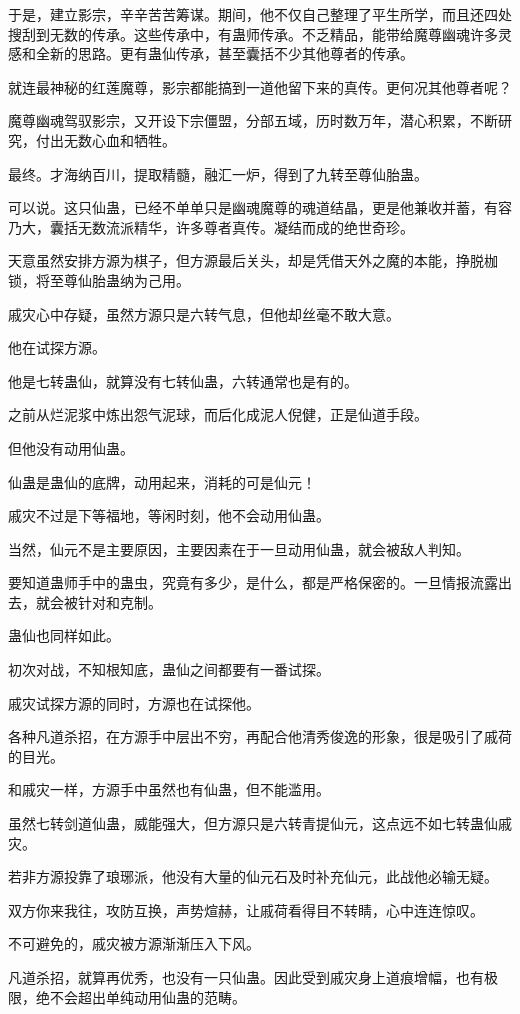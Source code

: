 \begin{this_body}
于是，建立影宗，辛辛苦苦筹谋。期间，他不仅自己整理了平生所学，而且还四处搜刮到无数的传承。这些传承中，有蛊师传承。不乏精品，能带给魔尊幽魂许多灵感和全新的思路。更有蛊仙传承，甚至囊括不少其他尊者的传承。

就连最神秘的红莲魔尊，影宗都能搞到一道他留下来的真传。更何况其他尊者呢？

魔尊幽魂驾驭影宗，又开设下宗僵盟，分部五域，历时数万年，潜心积累，不断研究，付出无数心血和牺牲。

最终。才海纳百川，提取精髓，融汇一炉，得到了九转至尊仙胎蛊。

可以说。这只仙蛊，已经不单单只是幽魂魔尊的魂道结晶，更是他兼收并蓄，有容乃大，囊括无数流派精华，许多尊者真传。凝结而成的绝世奇珍。

天意虽然安排方源为棋子，但方源最后关头，却是凭借天外之魔的本能，挣脱枷锁，将至尊仙胎蛊纳为己用。

戚灾心中存疑，虽然方源只是六转气息，但他却丝毫不敢大意。

他在试探方源。

他是七转蛊仙，就算没有七转仙蛊，六转通常也是有的。

之前从烂泥浆中炼出怨气泥球，而后化成泥人倪健，正是仙道手段。

但他没有动用仙蛊。

仙蛊是蛊仙的底牌，动用起来，消耗的可是仙元！

戚灾不过是下等福地，等闲时刻，他不会动用仙蛊。

当然，仙元不是主要原因，主要因素在于一旦动用仙蛊，就会被敌人判知。

要知道蛊师手中的蛊虫，究竟有多少，是什么，都是严格保密的。一旦情报流露出去，就会被针对和克制。

蛊仙也同样如此。

初次对战，不知根知底，蛊仙之间都要有一番试探。

戚灾试探方源的同时，方源也在试探他。

各种凡道杀招，在方源手中层出不穷，再配合他清秀俊逸的形象，很是吸引了戚荷的目光。

和戚灾一样，方源手中虽然也有仙蛊，但不能滥用。

虽然七转剑道仙蛊，威能强大，但方源只是六转青提仙元，这点远不如七转蛊仙戚灾。

若非方源投靠了琅琊派，他没有大量的仙元石及时补充仙元，此战他必输无疑。

双方你来我往，攻防互换，声势煊赫，让戚荷看得目不转睛，心中连连惊叹。

不可避免的，戚灾被方源渐渐压入下风。

凡道杀招，就算再优秀，也没有一只仙蛊。因此受到戚灾身上道痕增幅，也有极限，绝不会超出单纯动用仙蛊的范畴。


\end{this_body}
